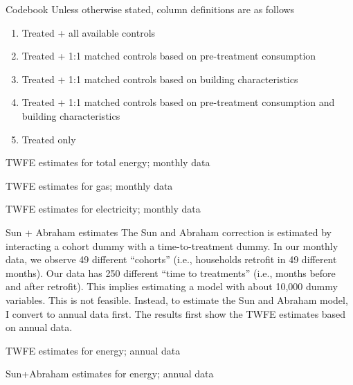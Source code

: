 \documentclass[8pt]{beamer}
\begin{document}
\begin{frame}{Codebook}
	Unless otherwise stated, column definitions are as follows
	\begin{enumerate}
		\item Treated + all available controls
		\item Treated + 1:1 matched controls based on pre-treatment consumption
		\item Treated + 1:1 matched controls based on building characteristics
		\item Treated + 1:1 matched controls based on pre-treatment consumption and building characteristics
		\item Treated only
	\end{enumerate}
\end{frame}

\begin{frame}{TWFE estimates for total energy; monthly data}
	
\end{frame}

\begin{frame}{TWFE estimates for gas; monthly data}
	
\end{frame}

\begin{frame}{TWFE estimates for electricity; monthly data}
	
\end{frame}

\begin{frame}{Sun + Abraham estimates}
	The Sun and Abraham correction is estimated by interacting a cohort dummy with a time-to-treatment dummy. In our monthly data, we observe 49 different ``cohorts'' (i.e., households retrofit in 49 different months).  Our data has 250 different ``time to treatments'' (i.e., months before and after retrofit). This implies estimating a model with about 10,000 dummy variables.  This is not feasible. Instead, to estimate the Sun and Abraham model, I convert to annual data first. The results first show the TWFE estimates based on annual data.
\end{frame}

\begin{frame}{TWFE estimates for energy; annual data}
	
\end{frame}

\begin{frame}{Sun+Abraham estimates for energy; annual data}
	
\end{frame}
\end{document}
